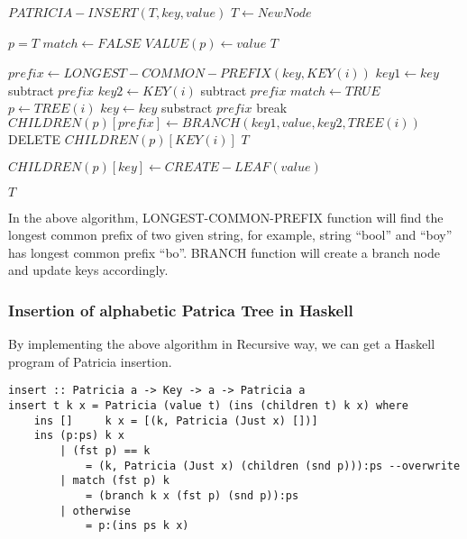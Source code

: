 \documentclass{article}
\begin{document}
\begin{algorithmic}
\STATE $PATRICIA-INSERT(T, key, value)$
   \STATE $T \leftarrow NewNode$ \ENDIF

  \STATE $p=T$
  \LOOP
    \STATE $match \leftarrow FALSE$
        \STATE $VALUE(p) \leftarrow value$
        \RETURN $T$
      \ENDIF

      \STATE $prefix \leftarrow LONGEST-COMMON-PREFIX(key, KEY(i))$
      \STATE $key1 \leftarrow key$ subtract $prefix$
      \STATE $key2 \leftarrow KEY(i)$ subtract $prefix$
        \STATE $match \leftarrow TRUE$
          \STATE $p \leftarrow TREE(i)$
          \STATE $key \leftarrow key$ substract $prefix$
          \STATE break
        \ELSE
          \STATE $CHILDREN(p)[prefix] \leftarrow BRANCH(key1, value, key2, TREE(i))$
          \STATE DELETE $CHILDREN(p)[KEY(i)]$
          \RETURN $T$
        \ENDIF
      \ENDIF

        \STATE $CHILDREN(p)[key] \leftarrow CREATE-LEAF(value)$
      \ENDIF
    \ENDFOR

  \ENDLOOP
  \RETURN $T$
\end{algorithmic}

In the above algorithm, LONGEST-COMMON-PREFIX function will find the longest
common prefix of two given string, for example, string ``bool'' and ``boy''
has longest common prefix ``bo''. BRANCH function will create a branch node
and update keys accordingly.

\subsubsection*{Insertion of alphabetic Patrica Tree in Haskell}
By implementing the above algorithm in Recursive way, we can get a 
Haskell program of Patricia insertion.

\lstset{language=Haskell}
\begin{lstlisting}
insert :: Patricia a -> Key -> a -> Patricia a
insert t k x = Patricia (value t) (ins (children t) k x) where
    ins []     k x = [(k, Patricia (Just x) [])]
    ins (p:ps) k x 
        | (fst p) == k 
            = (k, Patricia (Just x) (children (snd p))):ps --overwrite
        | match (fst p) k 
            = (branch k x (fst p) (snd p)):ps
        | otherwise 
            = p:(ins ps k x)

\end{lstlisting}
\end{document}

